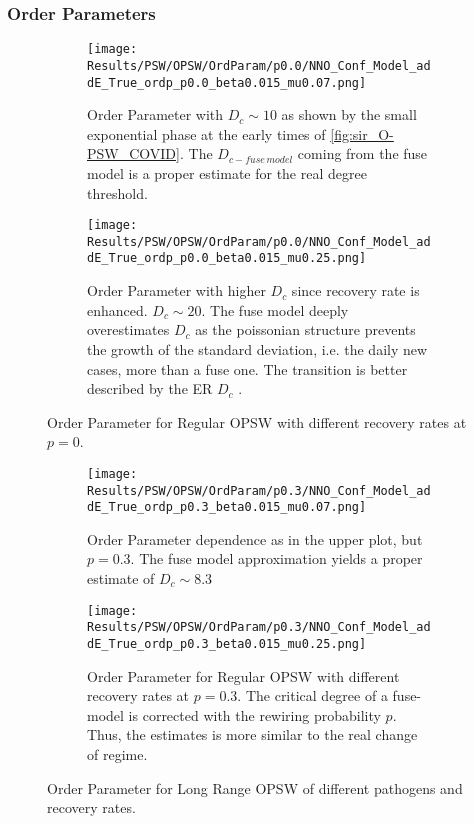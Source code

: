 \documentclass[a4paper,10pt,twoside]{book} %
\theoremstyle{definition}
\begin{document}
\subsubsection*{Order Parameters}
\begin{figure}[t]
	\begin{subfigure}[t]{0.48\linewidth}
		\centering
		\texttt{[image: Results/PSW/OPSW/OrdParam/p0.0/NNO\_Conf\_Model\_addE\_True\_ordp\_p0.0\_beta0.015\_mu0.07.png]} 
		\caption{Order Parameter with $D_c \sim 10$ as shown by the small exponential phase at the early times of \autoref{fig:sir_O-PSW_COVID}. The $ D_{c-fuse\, model}$ coming from the fuse model is a proper estimate for the real degree threshold.}
		\label{fig:Ordp_OPSW_COVID19_D14}
	\end{subfigure}
	\begin{subfigure}[t]{0.48\linewidth}
		\centering
		\texttt{[image: Results/PSW/OPSW/OrdParam/p0.0/NNO\_Conf\_Model\_addE\_True\_ordp\_p0.0\_beta0.015\_mu0.25.png]}
		\caption{Order Parameter with higher $D_c$ since recovery rate is enhanced. $D_c \sim 20$.
		The fuse model deeply overestimates $ D_c$ as the poissonian structure prevents the growth of the standard deviation, i.e. the daily new cases, more than a fuse one. The transition is better described by the ER $ D_c$ .}
		\label{fig:Ordp_OPSW_highmu_COVID19}
	\end{subfigure}
	\caption{Order Parameter for Regular OPSW with different recovery rates at $p = 0$. }
	\label{fig:Ordp_OPSW_COVID19_panel}
\end{figure}

\begin{figure}[t]
	\begin{subfigure}[t]{0.48\linewidth}
		\texttt{[image: Results/PSW/OPSW/OrdParam/p0.3/NNO\_Conf\_Model\_addE\_True\_ordp\_p0.3\_beta0.015\_mu0.07.png]}
		\caption{Order Parameter dependence as in the upper plot, but $ p = 0.3$. The fuse model approximation yields a proper estimate of $ D_c \sim 8.3$}
		\label{fig:Ordp_OPSW_Dc8.3_p0.3}
	\end{subfigure}
	\begin{subfigure}[t]{0.48\linewidth}
		\texttt{[image: Results/PSW/OPSW/OrdParam/p0.3/NNO\_Conf\_Model\_addE\_True\_ordp\_p0.3\_beta0.015\_mu0.25.png]}
		\caption{Order Parameter for Regular OPSW with different recovery rates at $p = 0.3$.
		The critical degree of a fuse-model is corrected with the rewiring probability $ p$. Thus, the estimates is more similar to the real change of regime.}
		\label{fig:Ordp_OPSW_highmu_p0.3}
	\end{subfigure}
	\caption{Order Parameter for Long Range OPSW of different pathogens and recovery rates.}
	\label{fig:Ordp_OPSW_COVID19_p0.3_panel}
\end{figure}
\end{document}
